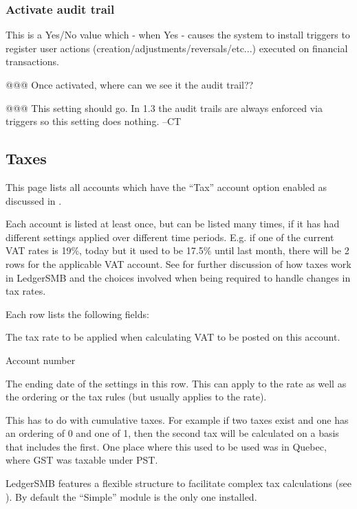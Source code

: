 \subsubsection{Activate audit trail}
\label{subsubsec-company-config-audit-control-audit-trail}

This is a Yes/No value which - when Yes - causes the system to install triggers to register
user actions (creation/adjustments/reversals/etc...) executed on financial transactions.


@@@ Once activated, where can we see it the audit trail??

@@@ This setting should go.  In 1.3 the audit trails are always enforced via
triggers so this setting does nothing.  --CT

\subsection{Taxes}
\label{subsec-company-config-taxes}


This page lists all accounts which have the ``Tax'' account option enabled as discussed in .

Each account is listed at least once, but can be listed many times, if it has had different
settings applied over different time periods. E.g. if one of the current VAT rates is 19\%,
today but it used to be 17.5\% until last month, there will be 2 rows for the applicable
VAT account. See  for further discussion of how taxes work in
LedgerSMB and the choices involved when being required to handle changes in tax rates.

Each row lists the following fields:

\begin{description}[style=nextline]
\item [Rate (\%)] The tax rate to be applied when calculating VAT to be posted on this account.
\item [Number] Account number
\item [Valid To] The ending date of the settings in this row. This can apply to the rate as well as the ordering or the tax rules (but usually applies to the rate).
\item [Ordering] This has to do with cumulative taxes.  For example if two taxes
exist and one has an ordering of 0 and one of 1, then the second tax will be
calculated on a basis that includes the first.  One place where this used to be
used was in Quebec, where GST was taxable under PST.
\item [Tax rules] LedgerSMB features a flexible structure to facilitate complex tax
calculations (see ). By default the ``Simple'' module
is the only one installed.
\end{description}

